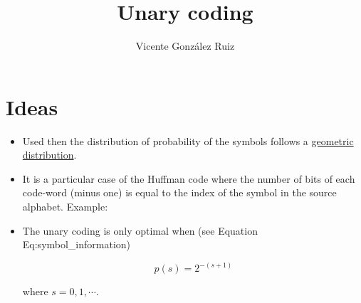 
\title{Unary coding}

\author{Vicente González Ruiz}

\maketitle

\section{Ideas}
\begin{itemize}
\item
  Used then the distribution of probability of the symbols follows a
  \href{https://en.wikipedia.org/wiki/Geometric_distribution}{geometric
  distribution}.
\item
  It is a particular case of the Huffman code where the number of bits
  of each code-word (minus one) is equal to the index of the symbol in
  the source alphabet. Example:
\end{itemize}


\begin{itemize}
\item
  The unary coding is only optimal when (see Equation
  Eq:symbol\_information)

  \begin{equation}
    p(s) = 2^{-(s+1)} \tag{Eq:Unary}
  \end{equation}

  where \(s=0,1,\cdots\).
\end{itemize}

